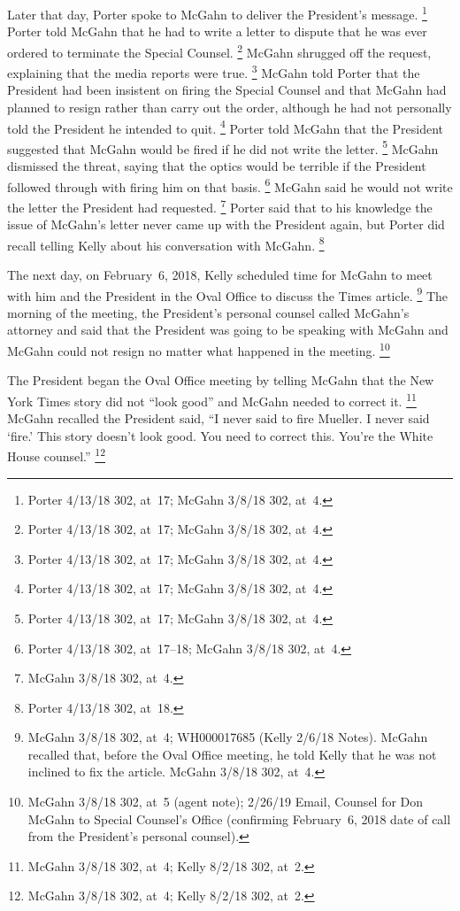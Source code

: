 Later that day, Porter spoke to McGahn to deliver the President's message.%
\footnote{Porter 4/13/18 302, at~17;
McGahn 3/8/18 302, at~4.}
Porter told McGahn that he had to write a letter to dispute that he was ever ordered to terminate the Special Counsel.%
\footnote{Porter 4/13/18 302, at~17;
McGahn 3/8/18 302, at~4.}
McGahn shrugged off the request, explaining that the media reports were true.%
\footnote{Porter 4/13/18 302, at~17;
McGahn 3/8/18 302, at~4.}
McGahn told Porter that the President had been insistent on firing the Special Counsel and that McGahn had planned to resign rather than carry out the order, although he had not personally told the President he intended to quit.%
\footnote{Porter 4/13/18 302, at~17;
McGahn 3/8/18 302, at~4.}
Porter told McGahn that the President suggested that McGahn would be fired if he did not write the letter.%
\footnote{Porter 4/13/18 302, at~17;
McGahn 3/8/18 302, at~4.}
McGahn dismissed the threat, saying that the optics would be terrible if the President followed through with firing him on that basis.%
\footnote{Porter 4/13/18 302, at~17--18;
McGahn 3/8/18 302, at~4.}
McGahn said he would not write the letter the President had requested.%
\footnote{McGahn 3/8/18 302, at~4.}
Porter said that to his knowledge the issue of McGahn's letter never came up with the President again, but Porter did recall telling Kelly about his conversation with McGahn.%
\footnote{Porter 4/13/18 302, at~18.}

The next day, on February~6, 2018, Kelly scheduled time for McGahn to meet with him and the President in the Oval Office to discuss the Times article.%
\footnote{McGahn 3/8/18 302, at~4;
WH000017685 (Kelly 2/6/18 Notes).
McGahn recalled that, before the Oval Office meeting, he told Kelly that he was not inclined to fix the article.
McGahn 3/8/18 302, at~4.}
The morning of the meeting, the President's personal counsel called McGahn's attorney and said that the President was going to be speaking with McGahn and McGahn could not resign no matter what happened in the meeting.%
\footnote{McGahn 3/8/18 302, at~5 (agent note);
2/26/19 Email, Counsel for Don McGahn to Special Counsel's Office (confirming February~6, 2018 date of call from the President's personal counsel).}

The President began the Oval Office meeting by telling McGahn that the New York Times story did not ``look good'' and McGahn needed to correct it.%
\footnote{McGahn 3/8/18 302, at~4; Kelly 8/2/18 302, at~2.}
McGahn recalled the President said, ``I never said to fire Mueller.
I never said `fire.'
This story doesn't look good.
You need to correct this.
You're the White House counsel.''%
\footnote{McGahn 3/8/18 302, at~4; Kelly 8/2/18 302, at~2.}


